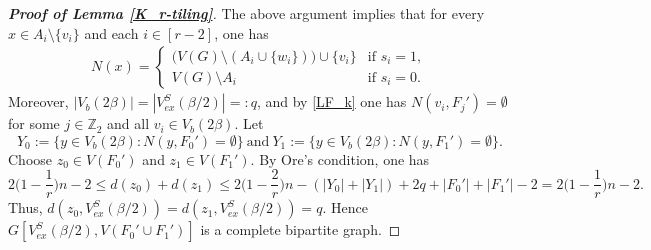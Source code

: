 \documentclass[11pt, a4paper]{article}
\theoremstyle{definition}
\newcommand{\<}{\subseteq}
\begin{document}
\begin{proof}[\bf Proof of Lemma \ref{K_r-tiling}]
The above argument implies that for every $x\in A_i\setminus \{v_i\}$ and each $i\in [r-2]$, one has
\begin{align}\label{eq:neighbor}
    N(x) = \left\{
\begin{array}{ll}
\big( V(G) \setminus (A_i \cup \{w_i\}) \big) \cup \{v_i\} & \text{if } s_i=1, \\
V(G) \setminus A_i & \text{if } s_i=0.
\end{array}
\right.
\end{align}
Moreover, $|V_b(2\beta)|=|V_{ex}^S(\beta/2)|=:q$, and   by  \eqref{LF_k} one has $N(v_i,F_j')=\emptyset$ for some $j\in \mathbb{Z}_2$ and all $v_i\in V_b(2\beta)$. 
Let $$ Y_0:=\{y\in V_b(2\beta):N(y,F_0')=\emptyset\}\ \text{and} \ Y_1:=\{y\in V_b(2\beta):N(y,F_1')=\emptyset\}.$$
Choose $z_0\in V(F_0')$ and $z_1\in V(F_1')$. By Ore's condition, one has
$$
2\Big(1-\frac{1}{r}\Big)n-2\leq d(z_0)+d(z_1)\leq 2\Big(1-\frac{2}{r}\Big)n-(|Y_0|+|Y_1|)+2q+|F_0'|+|F_1'|-2=2\Big(1-\frac{1}{r}\Big)n-2. 
$$
Thus, $d(z_0,V_{ex}^S(\beta/2))=d(z_1,V_{ex}^S(\beta/2))=q$. Hence  $G[V_{ex}^S(\beta/2),V(F_0'\cup F_1')]$ is a complete bipartite graph. 


\end{proof}
\end{document}
